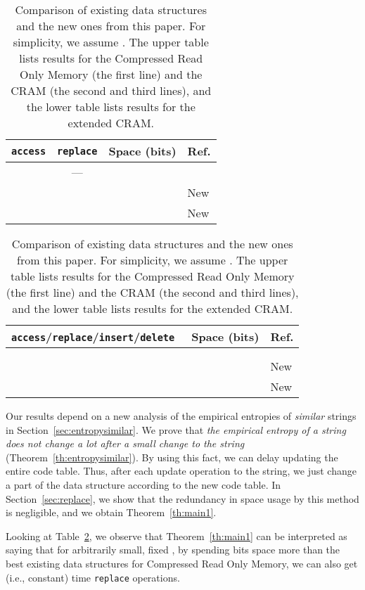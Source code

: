 \documentclass{llncs}
\begin{document}
\begin{table}[tb]
  \small
  \caption{Comparison of existing data structures and the new ones from this
  paper.
  For simplicity, we assume .
  The upper table lists results for the Compressed Read Only Memory (the
  first line) and the CRAM (the second and third lines), and the lower table
  lists results for the extended CRAM.}
  \label{tbl:comparison}

\smallskip
\footnotesize

  \begin{tabular}{ccll}
  \texttt{access} & \texttt{replace} & Space (bits) & Ref. \\ \hline
   & --- &  & \cite{FerVen07b,GonzalezN06} \\
   &  &  & New \\
   &  &  & New \\ \hline
  \end{tabular}
\bigskip

  \begin{tabular}{cll}
  \texttt{access}/\texttt{replace}/\texttt{insert}/\texttt{delete}\,\,\, & Space (bits) & Ref. \\ \hline
  {} &  & \cite{NavSad10} \\
  {} &  & \cite{NavSad10} \\
  {} &  & New \\
   &  & New \\
  \hline
  \end{tabular}
\end{table}


Our results depend on a new analysis of the empirical entropies of
\emph{similar} strings in Section~\ref{sec:entropysimilar}.
We prove that \emph{the empirical entropy of a string does not change a lot
after a small change to the string} (Theorem~\ref{th:entropysimilar}).
By using this fact, we can delay updating the entire code table.
Thus, after each update operation to the string, we just change a part of
the data structure according to the new code table.
In Section~\ref{sec:replace}, we show that the redundancy in space usage by
this method is negligible, and we obtain Theorem~\ref{th:main1}.

Looking at Table~\ref{tbl:comparison}, we observe that Theorem~\ref{th:main1}
can be interpreted as saying that for arbitrarily small, fixed
, by spending  bits
space more than the best existing data structures for
Compressed Read Only Memory, we can also get
 (i.e., constant) time \texttt{replace} operations.
\end{document}
